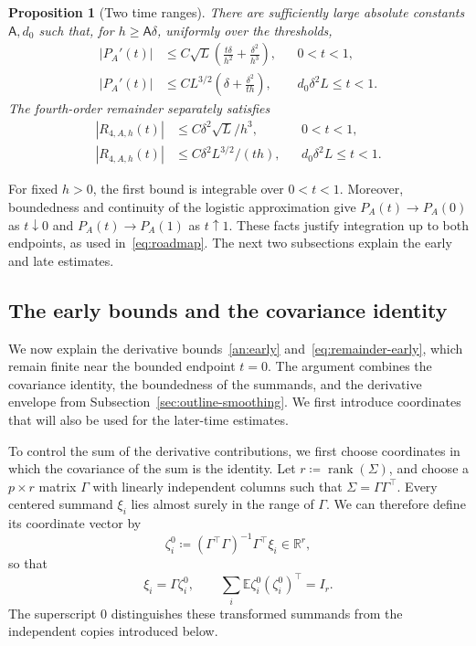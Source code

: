 \documentclass[11pt,letterpaper]{article}
\newcommand{\Ac}{\mathsf A}
\newtheorem{proposition}{Proposition}
\theoremstyle{remark}
\newcommand{\E}{\mathbb E}
\newcommand{\R}{\mathbb R}
\begin{document}
\begin{proposition}[Two time ranges]\label{an:prop:derivative}
There are sufficiently large absolute constants \(\Ac,d_0\) such that,
for \(h\ge\Ac\delta\), uniformly over the thresholds,
\begin{align}
 |P_A'(t)|&\le C\sqrt L\left(
 \frac{t\delta}{h^2}+\frac{\delta^2}{h^3}\right),
 &&0<t<1,\label{an:early}\\
 |P_A'(t)|&\le CL^{3/2}\left(
 \delta+\frac{\delta^2}{t h}\right),
 &&d_0\delta^2L\le t<1.\label{an:late}
\end{align}
The fourth-order remainder separately satisfies
\begin{align}
 |R_{4,A,h}(t)|&\le C\delta^2\sqrt L/h^3,
 &&0<t<1,\label{eq:remainder-early}\\
 |R_{4,A,h}(t)|&\le C\delta^2L^{3/2}/(t h),
 &&d_0\delta^2L\le t<1.\label{an:remainder}
\end{align}
\end{proposition}

For fixed \(h>0\), the first bound is integrable over \(0<t<1\).
Moreover, boundedness and continuity of the logistic approximation give
\(P_A(t)\to P_A(0)\) as \(t\downarrow0\) and
\(P_A(t)\to P_A(1)\) as \(t\uparrow1\). These facts justify integration
up to both endpoints, as used in~\eqref{eq:roadmap}. The next two
subsections explain the early and late estimates.

\subsection{The early bounds and the covariance identity}
\label{sec:outline-early}

We now explain the derivative bounds~\eqref{an:early}
and~\eqref{eq:remainder-early}, which remain finite near the bounded
endpoint \(t=0\). The argument combines the covariance identity,
the boundedness of the summands, and the derivative envelope from
Subsection~\ref{sec:outline-smoothing}. We first introduce coordinates
that will also be used for the later-time estimates.

To control the sum of the derivative contributions, we first choose
coordinates in which the covariance of the sum is the identity.
Let \(r\coloneqq\operatorname{rank}(\Sigma)\), and choose a \(p\times r\)
matrix \(\Gamma\) with linearly independent columns such that
\(\Sigma=\Gamma\Gamma^\top\). Every centered summand \(\xi_i\) lies
almost surely in the range of \(\Gamma\). We can therefore define its
coordinate vector by
\[
 \zeta_i^0\coloneqq(\Gamma^\top\Gamma)^{-1}\Gamma^\top\xi_i\in\R^r,
\]
so that
\[
 \xi_i=\Gamma\zeta_i^0,\qquad
 \sum_i\E\zeta_i^0(\zeta_i^0)^\top=I_r.
\]
The superscript \(0\) distinguishes these transformed summands from the
independent copies introduced below.
\end{document}
